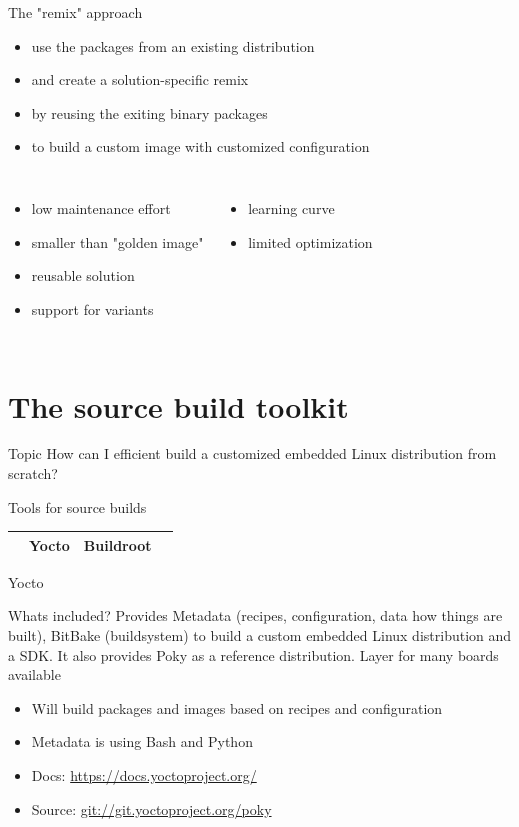 \documentclass{beamer}
\newcommand\pro{\item[$+$]}
\newcommand\con{\item[$-$]}
\begin{document}
\begin{frame}{The "remix" approach}
	\begin{itemize}
		\item use the packages from an existing distribution
		\item and create a solution-specific remix
		\item by reusing the exiting binary packages
		\item to build a custom image with customized configuration
	\end{itemize}

	\begin{columns}
		\centering
		\begin{itemize}
			\pro low maintenance effort
			\pro smaller than "golden image"
			\pro reusable solution
			\pro support for variants
		\end{itemize}
		\centering
		\begin{itemize}
			\con learning curve
			\con limited optimization
		\end{itemize}
	\end{columns}
\end{frame}

\section{The source build toolkit}

\begin{frame}
	\begin{block}{Topic}
		How can I efficient build a customized embedded Linux distribution from scratch?
	\end{block}
\end{frame}

\begin{frame}{Tools for source builds}
	\begin{tabular}{c|ccc}
		& \textbf{Yocto} & \textbf{Buildroot}  \\
		\hline
	\end{tabular}
\end{frame}

\begin{frame}{Yocto}
	\begin{block}{Whats included?}
		Provides Metadata (recipes, configuration, data how things are built), BitBake (buildsystem) to build a custom embedded Linux distribution and a SDK. It also provides Poky as a reference distribution. Layer for many boards available
	\end{block}

	\begin{itemize}
		\item Will build packages and images based on recipes and configuration
		\item Metadata is using Bash and Python
		\item Docs: \url{https://docs.yoctoproject.org/}
		\item Source: \url{git://git.yoctoproject.org/poky}
	\end{itemize}
\end{frame}
\end{document}
